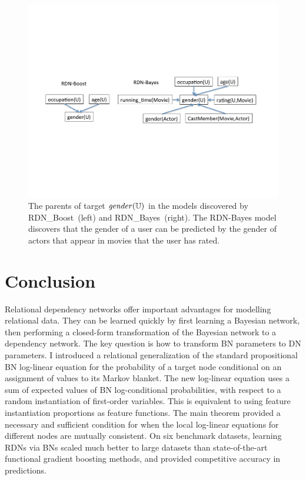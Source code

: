 \documentclass{sfuthesis}
\begin{document}
\begin{figure}[H]
\begin{center}
\includegraphics[width=1\textwidth]{dn-structure}
\caption{The parents of target $\it{gender}(\mathbb{U})$ in the models discovered by RDN\_Boost~(left) and RDN\_Bayes~(right). The RDN-Bayes model discovers that the gender of a user can be predicted by the gender of actors that appear in movies that the user has rated.\label{fig:dn-structure}}
\end{center}
\end{figure}



\section{Conclusion} 
\label{sec:conclusion1}
Relational dependency networks offer important advantages for modelling relational data. They can be learned quickly by first learning a Bayesian network, then performing a closed-form transformation of the Bayesian network to a dependency network. The key question is how to transform BN parameters to DN parameters. I  introduced a relational generalization of the standard propositional BN log-linear equation for the probability of a target node conditional on an assignment of values to its Markov blanket. The new log-linear equation uses a sum of expected values of BN log-conditional probabilities, with respect to a random instantiation of first-order variables. This is equivalent to using feature instantiation proportions as feature functions.  The main theorem provided a necessary and sufficient condition for when the local log-linear equations for different nodes are mutually consistent. On six benchmark datasets, learning RDNs via BNs scaled much better to large datasets than state-of-the-art functional gradient boosting methods, and provided competitive accuracy in predictions.
\end{document}
